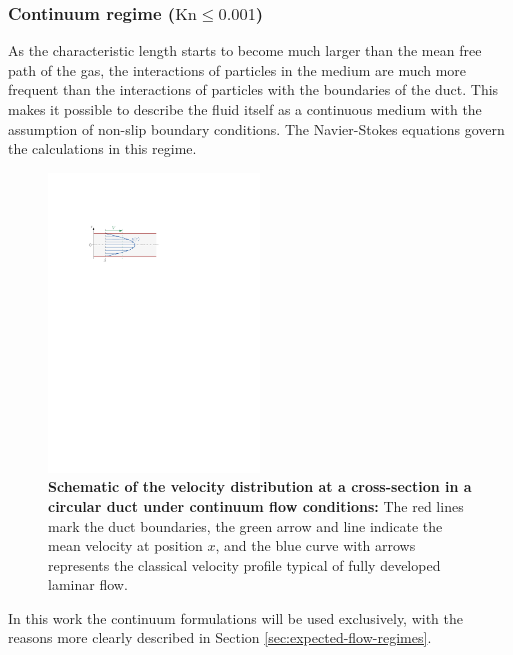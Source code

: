 \subsubsection*{Continuum regime ($\mathrm{Kn} \leq 0.001$)}
	As the characteristic length starts to become much larger than the mean free path of the gas, the interactions of particles in the medium are much more frequent than the interactions of particles with the boundaries of the duct.
	This makes it possible to describe the fluid itself as a continuous medium with the assumption of non-slip boundary conditions.
	The Navier-Stokes equations govern the calculations in this regime.
	\begin{figure}[H]
	    \centering
	    \includegraphics[width=0.5\textwidth]{src/02_foundations/fig_continuum-regime.pdf}
		\caption[Schematic of the velocity distribution at a cross-section in a circular duct under continuum flow conditions.]{
			\textbf{Schematic of the velocity distribution at a cross-section in a circular duct under continuum flow conditions:}
			The red lines mark the duct boundaries, the green arrow and line indicate the mean velocity at position $x$, and the blue curve with arrows represents the classical velocity profile typical of fully developed laminar flow. \cite{Cengel2017}
		}
		\label{fig:non-slip-flow}
	\end{figure}

	In this work the continuum formulations will be used exclusively, with the reasons more clearly described in Section \ref{sec:expected-flow-regimes}.
	\cite{rapp2017microfluidics, putignano2012supersonic, halwidl_development_2016, leishman_internal_2023}
